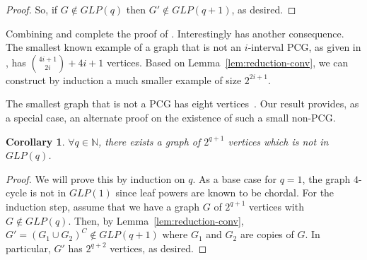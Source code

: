 \documentclass[11pt, letter]{article}
\newtheorem{cor}[theorem]{Corollary}
\theoremstyle{remark}
\newcommand{\bb}[0]{\mathbb}
\newcommand{\N}{\bb{N}}
\begin{document}
\begin{proof}
    

    So, if $G\notin GLP(q)$ then $G'\notin GLP(q+1)$, as desired.
\end{proof}

Combining  and  complete the proof of . Interestingly  has another consequence.
The smallest known example of a graph that is not an $i$-interval PCG, as given in \cite{GeneralizePCG}, has $\binom{4i+1}{2i} + 4i + 1 $ vertices. Based on Lemma~\ref{lem:reduction-conv}, we can construct by induction a much smaller example of size $2^{2i+1}$.

The smallest graph that is not a PCG has eight vertices~\cite{durocher2015graphs,7verticesPCG}.  Our result provides, as a special case, an alternate proof on the existence of such a small non-PCG. 


\begin{cor}
    $\forall q\in \N$, there exists a graph of $2^{q+1}$ vertices which is not in $GLP(q)$.
\end{cor}

\begin{proof}
    We will prove this by induction on $q$.  As a base case for $q = 1$, the graph $4$-cycle is not in $GLP(1)$ since leaf powers are known to be chordal.
    For the induction step, assume that we have a graph $G$ of $2^{q+1}$ vertices with $G\notin GLP(q)$. Then, by Lemma~\ref{lem:reduction-conv}, $G' = (G_1\cup G_2)^C\notin GLP(q+1)$ where $G_1$ and $G_2$ are copies of $G$. In particular, $G'$ has $2^{q+2}$ vertices, as desired.
\end{proof}
\end{document}
